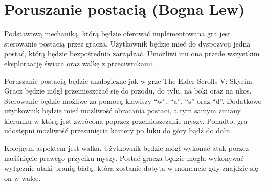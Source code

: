 \section{Poruszanie postacią (Bogna Lew)}
Podstawową mechaniką, którą będzie oferować implementowana gra jest sterowanie postacią przez gracza. Użytkownik będzie
mieć do dyspozycji jedną postać, którą będzie bezpośrednio zarządzać. Umożliwi mu ona przede wszystkim eksploraację
świata oraz walkę z przeciwnikami.

Poruszanie postacią będzie analogiczne jak w grze The Elder Scrolls V: Skyrim. Gracz będzie mógł przemieszczać się
do przodu, do tyłu, na boki oraz na ukos. Sterowanie będzie możliwe za pomocą klawiszy  “w”, “a”, “s” oraz “d”.
Dodatkowo użytkownik będzie mieć możliwość obracania postaci, a tym samym zmiany kierunku w którą jest zwrócona poprzez
przemieszczanie myszy. Ponadto, gra udostępni możliwość przesunięcia kamery po łuku do góry bądź do dołu.

Kolejnym aspektem jest walka. Użytkownik będzie mógł wykonać atak porzez naciśnięcie prawego przyciku myszy. Postać
gracza będzie mogła wykonywać wyłącznie ataki bronią białą, która zostanie dobyta w momencie gdy znajdzie się on w walce.